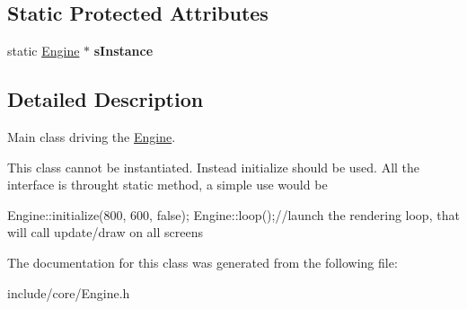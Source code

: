 \subsection*{\-Static \-Protected \-Attributes}
\begin{DoxyCompactItemize}
\item 
\hypertarget{classde_1_1_engine_a582339f67689e2e5f799f37017454282}{
static \hyperlink{classde_1_1_engine}{\-Engine} $\ast$ {\bfseries s\-Instance}}
\label{classde_1_1_engine_a582339f67689e2e5f799f37017454282}

\end{DoxyCompactItemize}


\subsection{\-Detailed \-Description}
\-Main class driving the \hyperlink{classde_1_1_engine}{\-Engine}. 

\-This class cannot be instantiated. \-Instead initialize should be used. \-All the interface is throught static method, a simple use would be


\begin{DoxyCode}
     Engine::initialize(800, 600, false);
     Engine::loop();//launch the rendering loop, that will call update/draw on
       all screens
\end{DoxyCode}
 

\-The documentation for this class was generated from the following file\-:\begin{DoxyCompactItemize}
\item 
include/core/\-Engine.\-h\end{DoxyCompactItemize}
